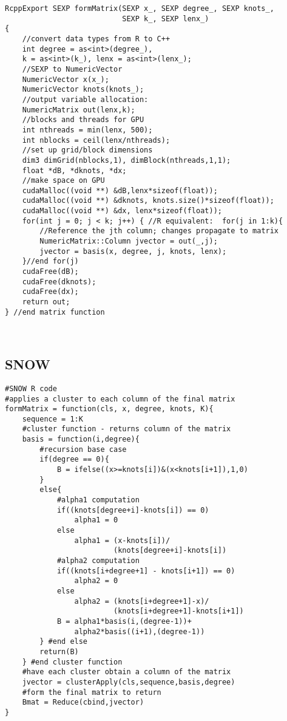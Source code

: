 \begin{lstlisting}
RcppExport SEXP formMatrix(SEXP x_, SEXP degree_, SEXP knots_,
                           SEXP k_, SEXP lenx_)
{
    //convert data types from R to C++
    int degree = as<int>(degree_),
    k = as<int>(k_), lenx = as<int>(lenx_);
    //SEXP to NumericVector
    NumericVector x(x_);
    NumericVector knots(knots_);
    //output variable allocation:
    NumericMatrix out(lenx,k);
    //blocks and threads for GPU
    int nthreads = min(lenx, 500);
    int nblocks = ceil(lenx/nthreads);
    //set up grid/block dimensions
    dim3 dimGrid(nblocks,1), dimBlock(nthreads,1,1);
    float *dB, *dknots, *dx;
    //make space on GPU
    cudaMalloc((void **) &dB,lenx*sizeof(float));
    cudaMalloc((void **) &dknots, knots.size()*sizeof(float));
    cudaMalloc((void **) &dx, lenx*sizeof(float));
    for(int j = 0; j < k; j++) { //R equivalent:  for(j in 1:k){
        //Reference the jth column; changes propagate to matrix
        NumericMatrix::Column jvector = out(_,j);
        jvector = basis(x, degree, j, knots, lenx);
    }//end for(j)
    cudaFree(dB);
    cudaFree(dknots);
    cudaFree(dx);
    return out;
} //end matrix function



\end{lstlisting}

\subsection{SNOW} %
\lstset{language=R}
\begin{lstlisting}
#SNOW R code
#applies a cluster to each column of the final matrix
formMatrix = function(cls, x, degree, knots, K){
    sequence = 1:K
    #cluster function - returns column of the matrix
    basis = function(i,degree){
        #recursion base case
        if(degree == 0){
            B = ifelse((x>=knots[i])&(x<knots[i+1]),1,0)
        }
        else{
            #alpha1 computation
            if((knots[degree+i]-knots[i]) == 0)
                alpha1 = 0
            else
                alpha1 = (x-knots[i])/
                         (knots[degree+i]-knots[i])
            #alpha2 computation
            if((knots[i+degree+1] - knots[i+1]) == 0)
                alpha2 = 0
            else
                alpha2 = (knots[i+degree+1]-x)/
                         (knots[i+degree+1]-knots[i+1])
            B = alpha1*basis(i,(degree-1))+
                alpha2*basis((i+1),(degree-1))
        } #end else
        return(B)
    } #end cluster function
    #have each cluster obtain a column of the matrix
    jvector = clusterApply(cls,sequence,basis,degree)
    #form the final matrix to return
    Bmat = Reduce(cbind,jvector)
}
\end{lstlisting}
